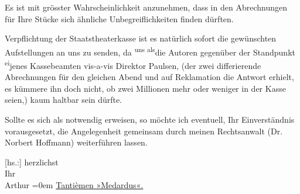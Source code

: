 \pstart
           Es ist mit grösster Wahrscheinlichkeit anzunehmen, dass in den Abrechnungen für Ihre
               Stücke sich ähnliche Unbegreiflichkeiten finden dürften.\pend
           
\pstart
           Verpflichtung der Staatstheaterkasse ist es
               natürlich sofort die gewünschten Aufstellungen an uns zu senden, da \substVorne{}\textsuperscript{uns als}\substDazwischen{}die\substHinten{} Autoren gegenüber der Standpunkt \substVorne{}\textsuperscript{ei}\substDazwischen{}je\substHinten{}nes Kassebeamten vis-a-vis Direktor Paulsen, \introOben{}(\introOben{}der zwei differierende Abrechnungen für
               den gleichen Abend und auf Reklamation die Antwort erhielt, es kümmere ihn doch
               nicht, ob zwei Millionen mehr oder weniger in der Kasse seien,\introOben{})\introOben{} kaum haltbar sein dürfte.\pend
           
\pstart
           Sollte es sich als notwendig erweisen, so möchte ich eventuell, Ihr Einverständnis
               vorausgesetzt, die Angelegenheit gemeinsam durch meinen Rechtsanwalt (Dr. Norbert Hoffmann) weiterführen lassen.\pend
           
\pstart
           {[}hs.:{]} herzlichst{\\[\baselineskip]}Ihr{\\[\baselineskip]}\spacefill\mbox{Arthur}\pend
           \leftskip=0em{}\vspace{1em}
\pstart
           \noindent{}\centering{}{\pb}\uline{Tantièmen »Medardus«.}\pend
           
